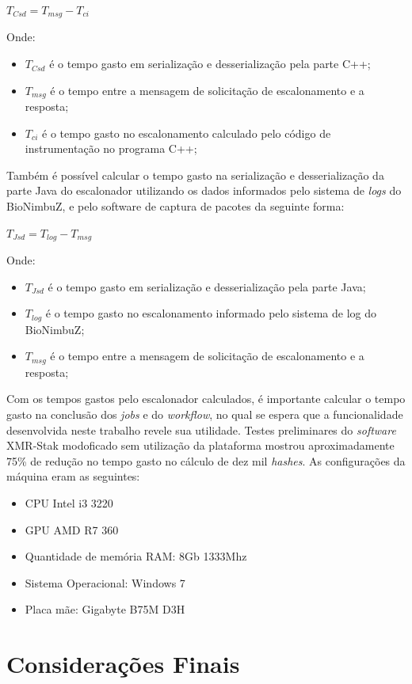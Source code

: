 \centerline{ $T_{Csd} = T_{msg} - T_{ci}$ }

Onde: 
 \begin{itemize}
 	\item $T_{Csd}$ é o tempo gasto em serialização e desserialização pela parte C++;
 	\item $T_{msg}$ é o tempo entre a mensagem de solicitação de escalonamento e a resposta;
 	\item $T_{ci}$ é o tempo gasto no escalonamento calculado pelo código de instrumentação no programa C++;
 \end{itemize}

Também é possível calcular o tempo gasto na serialização e desserialização da parte Java do escalonador utilizando os dados informados pelo sistema de \textit{logs} do BioNimbuZ, e pelo software de captura de pacotes da seguinte forma:

\centerline{ $T_{Jsd} = T_{log} - T_{msg}$ }

Onde: 
\begin{itemize}
	\item $T_{Jsd}$ é o tempo gasto em serialização e desserialização pela parte Java;
	\item $T_{log}$ é o tempo gasto no escalonamento informado pelo sistema de log do BioNimbuZ;
	\item $T_{msg}$ é o tempo entre a mensagem de solicitação de escalonamento e a resposta;
\end{itemize}

Com os tempos gastos pelo escalonador calculados, é importante calcular o tempo gasto na conclusão dos \textit{jobs} e do \textit{workflow}, no qual se espera que a funcionalidade desenvolvida neste trabalho revele sua utilidade. Testes preliminares do \textit{software} XMR-Stak modoficado sem utilização da plataforma mostrou aproximadamente 75\% de redução no tempo gasto no cálculo de dez mil \textit{hashes}. As configurações da máquina eram as seguintes:

\begin{itemize}
	\item \acrshort{CPU} Intel i3 3220
	\item \acrshort{GPU} AMD R7 360
	\item Quantidade de memória \acrshort{RAM}: 8Gb 1333Mhz
	\item Sistema Operacional: Windows 7
	\item Placa mãe: Gigabyte B75M D3H
\end{itemize}
 

\section{Considerações Finais}


